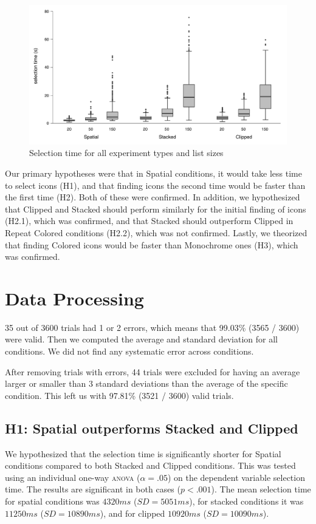 \documentclass{tufte-book} %
\begin{document}
\begin{figure}[h]
  \includegraphics[width=\linewidth]{all-durations.pdf}
  \caption{Selection time for all experiment types and list sizes}
  \label{fig:all-durations-chart}
\end{figure}

Our primary hypotheses were that in Spatial conditions, it would take less time to select icons (H1), and that finding icons the second time would be faster than the first time (H2). Both of these were confirmed. In addition, we hypothesized that Clipped and Stacked should perform similarly for the initial finding of icons (H2.1), which was confirmed, and that Stacked should outperform Clipped in Repeat Colored conditions (H2.2), which was not confirmed.
Lastly, we theorized that finding Colored icons would be faster than Monochrome ones (H3), which was confirmed.

\section{Data Processing}
35 out of 3600 trials had 1 or 2 errors, which means that 99.03\% (3565 / 3600) were valid. Then we computed the average and standard deviation for all conditions. We did not find any systematic error across conditions.

After removing trials with errors, 44 trials were excluded for having an average larger or smaller than 3 standard deviations than the average of the specific condition. This left us with 97.81\% (3521 / 3600) valid trials.

\subsection{H1: Spatial outperforms Stacked and Clipped}
We hypothesized that the selection time is significantly shorter for Spatial conditions compared to both Stacked and Clipped conditions. This was tested using an individual one-way \textsc{anova} ($\alpha = .05$) on the dependent variable selection time. The results are significant in both cases ($p < .001$). The mean selection time for spatial conditions was $4320 ms$ ($SD = 5051 ms$), for stacked conditions it was $11250 ms$ ($SD = 10890 ms$), and for clipped $10920 ms$ ($SD = 10090 ms$).
\end{document}
